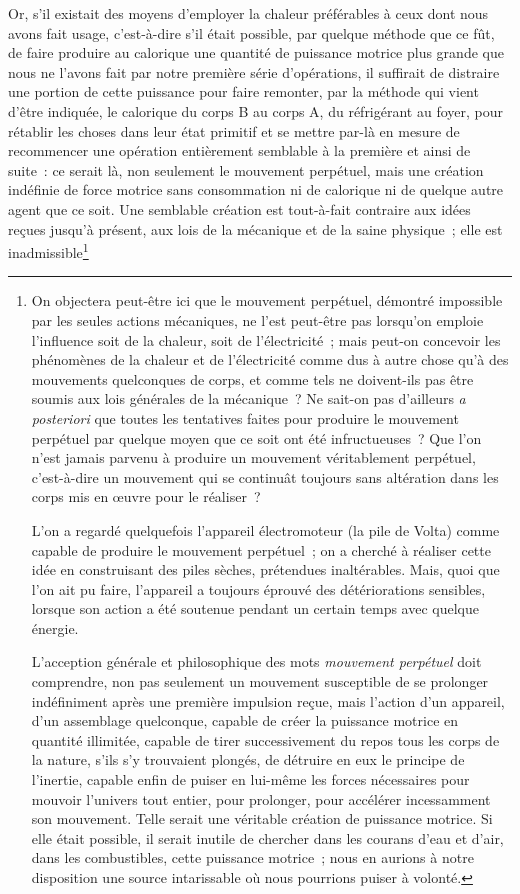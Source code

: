 \documentclass[french,twoside]{book} %
\begin{document}
Or, s’il existait des moyens d’employer la chaleur préférables à ceux dont nous avons fait usage, c’est-à-dire s’il était possible, par quelque méthode que ce fût, de faire produire au calorique une quantité de puissance motrice plus grande que nous ne l’avons fait par notre première série d’opérations, il suffirait de distraire une portion de cette puissance pour faire remonter, par la méthode qui vient d’être indiquée, le calorique du corps B au corps A, du réfrigérant au foyer, pour rétablir les choses dans leur état primitif et se mettre par-là en mesure de recommencer une opération entièrement semblable à la première et ainsi de suite : ce serait là, non seulement le mouvement perpétuel, mais une création indéfinie de force motrice sans consommation ni de calorique ni de quelque autre agent que ce soit. Une semblable création est tout-à-fait contraire aux idées reçues jusqu’à présent, aux lois de la mécanique et de la saine physique ; elle est inadmissible\footnote{ \noindent On objectera peut-être ici que le mouvement perpétuel, démontré impossible par les seules actions mécaniques, ne l’est peut-être pas lorsqu’on emploie l’influence soit de la chaleur, soit de l’électricité ; mais peut-on concevoir les phénomènes de la chaleur et de l’électricité comme dus à autre chose qu’à des mouvements quelconques de corps, et comme tels ne doivent-ils pas être soumis aux lois générales de la mécanique ? Ne sait-on pas d’ailleurs \emph{a posteriori} que toutes les tentatives faites pour produire le mouvement perpétuel par quelque moyen que ce soit ont été infructueuses ? Que l’on n’est jamais parvenu à produire un mouvement véritablement perpétuel, c’est-à-dire un mouvement qui se continuât toujours sans altération dans les corps mis en œuvre pour le réaliser ?\par
 L’on a regardé quelquefois l’appareil électromoteur (la pile de Volta) comme capable de produire le mouvement perpétuel ; on a cherché à réaliser cette idée en construisant des piles sèches, prétendues inaltérables. Mais, quoi que l’on ait pu faire, l’appareil a toujours éprouvé des détériorations sensibles, lorsque son action a été soutenue pendant un certain temps avec quelque énergie.\par
 L’acception générale et philosophique des mots \emph{mouvement perpétuel} doit comprendre, non pas seulement un mouvement susceptible de se prolonger indéfiniment après une première impulsion reçue, mais l’action d’un appareil, d’un assemblage quelconque, capable de créer la puissance motrice en quantité illimitée, capable de tirer successivement du repos tous les corps de la nature, s’ils s’y trouvaient plongés, de détruire en eux le principe de l’inertie, capable enfin de puiser en lui-même les forces nécessaires pour mouvoir l’univers tout entier, pour prolonger, pour accélérer incessamment son mouvement. Telle serait une véritable création de puissance motrice. Si elle était possible, il serait inutile de chercher dans les courans d’eau et d’air, dans les combustibles, cette puissance motrice ; nous en aurions à notre disposition une source intarissable où nous pourrions puiser à volonté.
}
\end{document}
